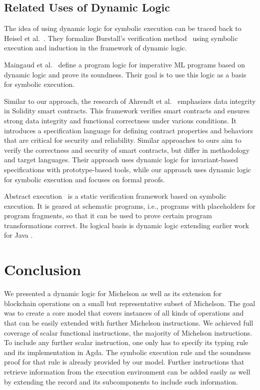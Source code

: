 \subsection{Related Uses of Dynamic Logic}
\label{sec:related-uses-dynamic}

The idea of using dynamic logic for symbolic execution can be traced
back to Heisel et al.~\cite{DBLP:conf/ki/HeiselRS87}. They formalize
Burstall's verification method~\cite{DBLP:conf/ifip/Burstall74} using
symbolic execution and induction in the framework of dynamic logic.

Maingaud et al.~\cite{DBLP:conf/foveoos/MaingaudBBHM10} define a
program logic for imperative ML programs based on dynamic logic and prove its
soundness. Their goal is to use this logic as a basis for symbolic
execution. 

Similar to our approach, the research of Ahrendt et
al.~\cite{ahrendt_et_al} emphasizes data integrity in Solidity smart
contracts. This framework verifies smart contracts and ensures strong
data integrity and functional correctness under various conditions. It
introduces a specification language for defining contract properties
and behaviors that are critical for security and reliability. Similar
approaches to ours aim to verify the correctness and security of smart
contracts, but differ in methodology and target languages. Their
approach uses dynamic logic for invariant-based specifications with
prototype-based tools, while our approach uses dynamic logic for
symbolic execution and focuses on formal proofs. 

Abstract execution~\cite{DBLP:conf/fm/SteinhofelH19} is a static
verification framework based on symbolic execution. It is geared at
schematic programs, i.e., programs with placeholders for program
fragments, so that it can be used to prove certain program
transformations correct. Its logical basis is dynamic logic 
extending earlier work for Java \cite{KeY3}.

\section{Conclusion}
\label{sec:conclusion}

We presented a dynamic logic for Michelson as well as its extension for blockchain operations
on a small but representative subset of Michelson.
The goal was to create a core model that covers instances of all kinds
of operations and that can be easily extended with further Michelson instructions.
We achieved full coverage of scalar functional instructions, the majority of Michelson
instructions.
To include any further scalar instruction,
one only has to specify its typing rule and its implementation in Agda.
The symbolic execution rule and the soundness proof for that rule is
already provided by our model.
Further instructions that retrieve information from the execution environment can be added
easily as well by extending the  record and its subcomponents
to include such information.

